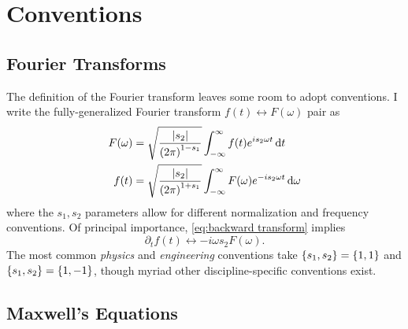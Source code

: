 \chapter{Conventions}

\section{Fourier Transforms\label{sec:general transform}}

The definition of the Fourier transform leaves some room to adopt conventions.
I write the fully-generalized Fourier transform $f(t) \leftrightarrow F(\omega)$ pair as
\begin{subequations}
  \begin{align}
    F(\omega) &= \sqrt{\frac{\abs{s_2}}{\qty(2\pi)^{1-s_1}}} \int_{-\infty}^{\infty} f(t) e^{i s_2 \omega t} \dd{t} \label{eq:forward transform} \\
    f(t) &= \sqrt{\frac{\abs{s_2}}{\qty(2\pi)^{1+s_1}}} \int_{-\infty}^{\infty} F(\omega) e^{- i s_2 \omega t} \dd{\omega} \label{eq:backward transform}
  \end{align}
\end{subequations}
where the $s_1, s_2$ parameters allow for different normalization and frequency conventions. 
Of principal importance, \cref{eq:backward transform} implies
\begin{equation}
  \partial_t f(t) \leftrightarrow -i \omega s_2 F(\omega).
\end{equation}
The most common \emph{physics} and \emph{engineering} conventions take $\qty{s_1, s_2} = \qty{1, 1}$ and $\qty{s_1, s_2} = \qty{1, -1}$, though myriad other discipline-specific conventions exist.

\section{\label{appendix:maxwell}Maxwell's Equations}


